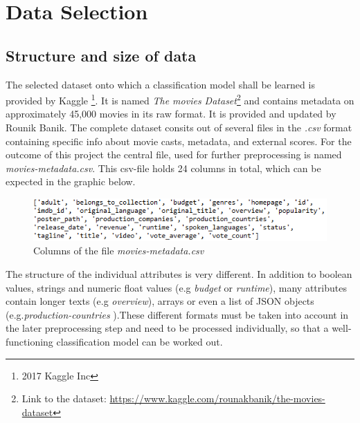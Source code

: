 \chapter{Data Selection}
\label{cha:data_selection}

\section{Structure and size of data}
The selected dataset onto which a classification model shall be learned is provided by Kaggle \footnote{2017 Kaggle Inc}. It is named \textit{The movies Dataset}\footnote{Link to the dataset: \hyperref[https://www.kaggle.com/rounakbanik/the-movies-dataset]{https://www.kaggle.com/rounakbanik/the-movies-dataset}} and contains metadata on approximately 45,000 movies in its raw format. It is provided and updated by Rounik Banik. The complete dataset consits out of several files in the \textit{.csv} format containing specific info about movie casts, metadata, and external scores. For the outcome of this project the central file, used for further preprocessing is named \textit{movies-metadata.csv}. This csv-file holds 24 columns in total, which can be expected in the graphic below.
\begin{figure}[ht]
	\centering
		\includegraphics[width=\textwidth]{images/Raw_dataset_headers.png}
	\caption{Columns of the file \textit{movies-metadata.csv}}
\end{figure}


The structure of the individual attributes is very different. In addition to boolean values, strings and numeric float values (e.g \textit{budget} or \textit{runtime}), many attributes contain longer texts (e.g \textit{overview}), arrays or even a list of JSON objects (e.g.\textit{production-countries} ).These different formats must be taken into account in the later preprocessing step and need to be processed individually, so that a well-functioning classification model can be worked out.


